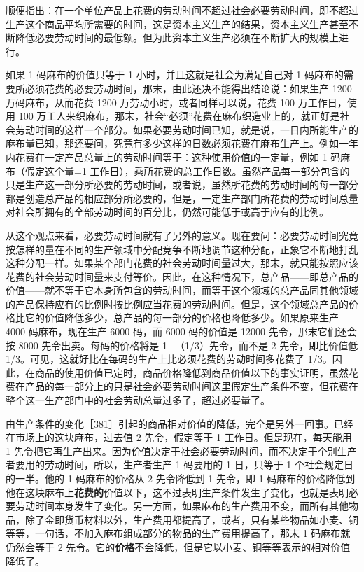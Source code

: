 顺便指出：在一个单位产品上花费的劳动时间不超过社会必要劳动时间，即不超过生产这个商品平均所需要的时间，这是资本主义生产的结果，资本主义生产甚至不断降低必要劳动时间的最低额。但为此资本主义生产必须在不断扩大的规模上进行。

如果 1 码麻布的价值只等于 1 小时，并且这就是社会为满足自己对 1 码麻布的需要所必须花费的必要劳动时间，那末，由此还决不能得出结论说：如果生产 1200 万码麻布，从而花费 1200 万劳动小时，或者同样可以说，花费 100 万工作日，使用 100 万工人来织麻布，那末，社会“必须”花费在麻布织造业上的，就正好是社会劳动时间的这样一个部分。如果必要劳动时间已知，就是说，一日内所能生产的麻布量已知，那还要问，究竟有多少这样的日数必须花费在麻布生产上。例如一年内花费在一定产品总量上的劳动时间等于：这种使用价值的一定量，例如 1 码麻布（假定这个量=1 工作日），乘所花费的总工作日数。虽然产品每一部分包含的只是生产这一部分所必要的劳动时间，或者说，虽然所花费的劳动时间的每一部分都是创造总产品的相应部分所必要的，但是，一定生产部门所花费的劳动时间总量对社会所拥有的全部劳动时间的百分比，仍然可能低于或高于应有的比例。

从这个观点来看，必要劳动时间就有了另外的意义。现在要问：必要劳动时间究竟按怎样的量在不同的生产领域中分配竞争不断地调节这种分配，正象它不断地打乱这种分配一样。如果某个部门花费的社会劳动时间量过大，那末，就只能按照应该花费的社会劳动时间量来支付等价。因此，在这种情况下，总产品——即总产品的价值——就不等于它本身所包含的劳动时间，而等于这个领域的总产品同其他领域的产品保持应有的比例时按比例应当花费的劳动时间。但是，这个领域总产品的价格比它的价值降低多少，总产品的每一部分的价格也降低多少。如果原来生产 4000 码麻布，现在生产 6000 码，而 6000 码的价值是 12000 先令，那末它们还会按 8000 先令出卖。每码的价格将是 1+（1/3）先令，而不是 2 先令，即比价值低 1/3。可见，这就好比在每码的生产上比必须花费的劳动时间多花费了 1/3。因此，在商品的使用价值已定时，商品价格降低到商品价值以下的事实证明，虽然花费在产品的每一部分上的只是社会必要劳动时间\fontbox{~\{}这里假定生产条件不变\fontbox{\}~}，但花费在整个这一生产部门中的社会劳动总量过多了，超过必要量了。

由生产条件的变化［381］引起的商品相对价值的降低，完全是另外一回事。已经在市场上的这块麻布，过去值 2 先令，假定等于 1 工作日。但是现在，每天能用 1 先令把它再生产出来。因为价值决定于社会必要劳动时间，而不决定于个别生产者要用的劳动时间，所以，生产者生产 1 码要用的 1 日，只等于 1 个社会规定日的一半。他的 1 码麻布的价格从 2 先令降低到 1 先令，即 1 码麻布的价格降低到他在这块麻布上\textbf{花费的}价值以下，这不过表明生产条件发生了变化，也就是表明必要劳动时间本身发生了变化。另一方面，如果麻布的生产费用不变，而所有其他物品，除了金即货币材料以外，生产费用都提高了，或者，只有某些物品如小麦、铜等等，一句话，不加入麻布组成部分的物品的生产费用提高了，那末 1 码麻布就仍然会等于 2 先令。它的\textbf{价格}不会降低，但是它以小麦、铜等等表示的相对价值降低了。

